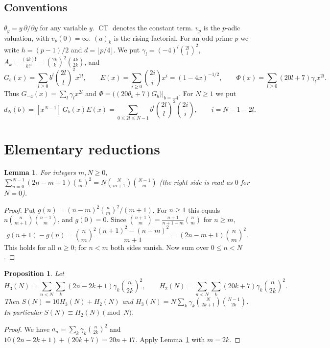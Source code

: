 \documentclass[11pt]{amsart}
\newtheorem{lemma}[theorem]{Lemma}
\newtheorem{proposition}[theorem]{Proposition}
\theoremstyle{definition}
\theoremstyle{remark}
\newcommand{\CT}{\operatorname{CT}}
\begin{document}
\subsection*{Conventions}
$\theta_y=y\,\partial/\partial y$ for any variable $y$. $\CT$ denotes the constant term.
$v_p$ is the $p$-adic valuation, with $v_p(0)=\infty$. $(a)_k$ is the rising factorial. For an odd
prime $p$ we write $h=(p-1)/2$ and $d=\lfloor p/4\rfloor$. We put
$\gamma_l=(-4)^l\binom{2l}l^2$, $A_k=\frac{(4k)!}{k!^4}=\binom{2k}k^2\binom{4k}{2k}$, and
\[
 G_b(x)=\sum_{l\ge0}b^l\binom{2l}l^2x^{2l},\qquad
 E(x)=\sum_{i\ge0}\binom{2i}ix^i=(1-4x)^{-1/2},\qquad
 \Phi(x)=\sum_{l\ge0}(20l+7)\gamma_lx^{2l}.
\]
Thus $G_{-4}(x)=\sum_l\gamma_lx^{2l}$ and $\Phi=\bigl((20\theta_b+7)G_b\bigr)|_{b=-4}$.
For $N\ge1$ we put
\begin{equation}\label{eq:dN}
 d_N(b)=[x^{N-1}]\,G_b(x)E(x)=\sum_{0\le2l\le N-1}b^l\binom{2l}l^2\binom{2i}i,\qquad i=N-1-2l.
\end{equation}

\section{Elementary reductions}\label{sec:elementary}

\begin{lemma}\label{lem:telescope}
For integers $m,N\ge0$,
$\displaystyle\sum_{n=0}^{N-1}(2n-m+1)\binom nm^2=N\binom N{m+1}\binom{N-1}m$
(the right side is read as $0$ for $N=0$).
\end{lemma}
\begin{proof}
Put $g(n)=(n-m)^2\binom nm^2/(m+1)$. For $n\ge1$ this equals $n\binom n{m+1}\binom{n-1}m$, and
$g(0)=0$. Since $\binom{n+1}m=\frac{n+1}{n+1-m}\binom nm$ for $n\ge m$,
\[
 g(n+1)-g(n)=\binom nm^2\frac{(n+1)^2-(n-m)^2}{m+1}=(2n-m+1)\binom nm^2.
\]
This holds for all $n\ge0$; for $n<m$ both sides vanish. Now sum over $0\le n<N$.
\end{proof}

\begin{proposition}\label{prop:split}
Let
\[
 H_3(N)=\sum_{n<N}\sum_k(2n-2k+1)\gamma_k\binom n{2k}^2,\qquad
 H_2(N)=\sum_{n<N}\sum_k(20k+7)\gamma_k\binom n{2k}^2 .
\]
Then $S(N)=10H_3(N)+H_2(N)$ and
$H_3(N)=N\sum_k\gamma_k\binom N{2k+1}\binom{N-1}{2k}$. In particular $S(N)\equiv H_2(N)\pmod N$.
\end{proposition}
\begin{proof}
We have $a_n=\sum_k\gamma_k\binom n{2k}^2$ and $10(2n-2k+1)+(20k+7)=20n+17$. Apply
Lemma~\ref{lem:telescope} with $m=2k$.
\end{proof}
\end{document}
